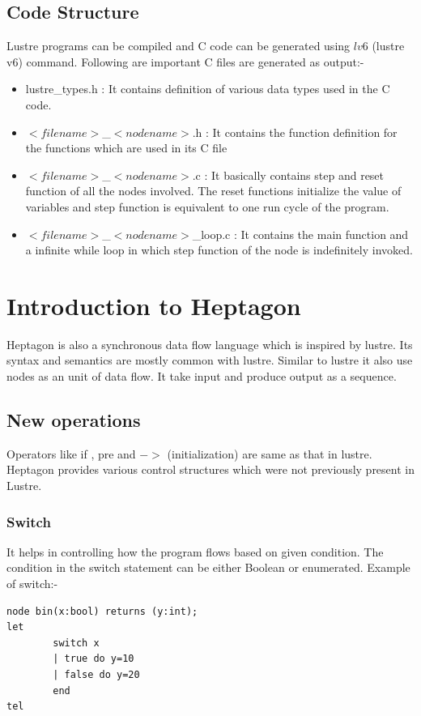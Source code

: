 \documentclass[16pt]{report}
\begin{document}
\subsection{Code Structure}
Lustre programs can be compiled and C code can be generated using $lv6$ (lustre v6) command. Following are important C files are generated as output:-
\begin{itemize}
    \item lustre\_types.h : It contains definition of various data types used in the C code.
    \item $<filename>$\_$<nodename>$.h : It contains the function definition for the functions which are used in its C file
    \item $<filename>$\_$<nodename>$.c : It basically contains step and reset function of all the nodes involved. The reset functions initialize the value of variables and step function is equivalent to one run cycle of the program.
    \item $<filename>$\_$<nodename>$\_loop.c : It contains the main function and a infinite while loop in which step function of the node is indefinitely invoked.
\end{itemize}

\newpage

\section{Introduction to Heptagon}
Heptagon \cite{heptagon} is also a synchronous data flow language which is inspired by lustre. Its syntax and semantics are mostly common with lustre. Similar to lustre it also use nodes as an unit of data flow. It take input and produce output as a sequence. \\

\subsection{New operations}
Operators like if , pre and $->$ (initialization) are same as that in lustre. Heptagon provides various control structures which were not previously present in Lustre.

\subsubsection{Switch}
It helps in controlling how the program flows based on given condition. The condition in the switch statement can be either Boolean or enumerated. Example of switch:-
\begin{verbatim}
node bin(x:bool) returns (y:int);
let 
    	switch x
    	| true do y=10 
    	| false do y=20 
    	end
tel
\end{verbatim}
\end{document}
